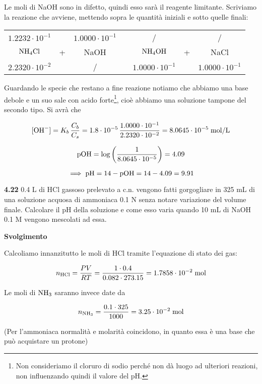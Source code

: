 Le moli di NaOH sono in difetto, quindi esso sarà il reagente limitante. Scriviamo la reazione che avviene, mettendo sopra le quantità iniziali e sotto quelle finali:

\begin{center}
    \begin{tabular}{ccccccc}
        $1.2232 \cdot 10^{-1}$ &  & $1.0000 \cdot 10^{-1}$ & & / & & /\\
        $\rm NH_4Cl$ & + & NaOH & \ce{->} & $\rm NH_4OH$ & + & NaCl\\
        $2.2320 \cdot 10^{-2}$ &  & / & & $1.0000 \cdot 10^{-1}$ & &$1.0000 \cdot 10^{-1}$\\
    \end{tabular}
\end{center}

Guardando le specie che restano a fine reazione notiamo che abbiamo una base debole e un suo sale con acido forte\footnote{Non consideriamo il cloruro di sodio perché non dà luogo ad ulteriori reazioni, non influenzando quindi il valore del pH.}, cioè abbiamo una soluzione tampone del secondo tipo. Si avrà che

$$[\text{OH}^-]=K_b\,\frac{C_b}{C_s}
=1.8 \cdot 10^{-5}\,\frac{1.0000 \cdot 10^{-1}}{2.2320 \cdot 10^{-2}}
=8.0645 \cdot 10^{-5} \; \rm mol/L$$

$$\rm pOH=\log \left( \frac{1}{8.0645 \cdot 10^{-5}} \right)=4.09$$

$$\implies \rm pH=14-pOH=14-4.09=9.91$$

\newpage

\textbf{4.22} 0.4 L di HCl gassoso prelevato a c.n. vengono fatti gorgogliare in 325 mL di una soluzione acquosa di ammoniaca 0.1 N senza notare variazione del volume finale. Calcolare il pH della soluzione e come esso varia quando 10 mL di NaOH 0.1 M vengono mescolati ad essa.

\vspace{0.2cm}\large\textbf{Svolgimento}\normalsize

\vspace{0.2cm} Calcoliamo innanzitutto le moli di HCl tramite l'equazione di stato dei gas:

$$n_{\text{HCl}}
=\frac{PV}{RT}
=\frac{1 \cdot 0.4}{0.082 \cdot 273.15}
=1.7858 \cdot 10^{-2} \; \rm mol$$

Le moli di $\rm NH_3$ saranno invece date da

$$n_{\text{NH}_3}
=\frac{0.1 \cdot 325}{1000}
=3.25 \cdot 10^{-2} \; \rm mol$$

(Per l'ammoniaca normalità e molarità coincidono, in quanto essa è una base che può acquistare un protone)

